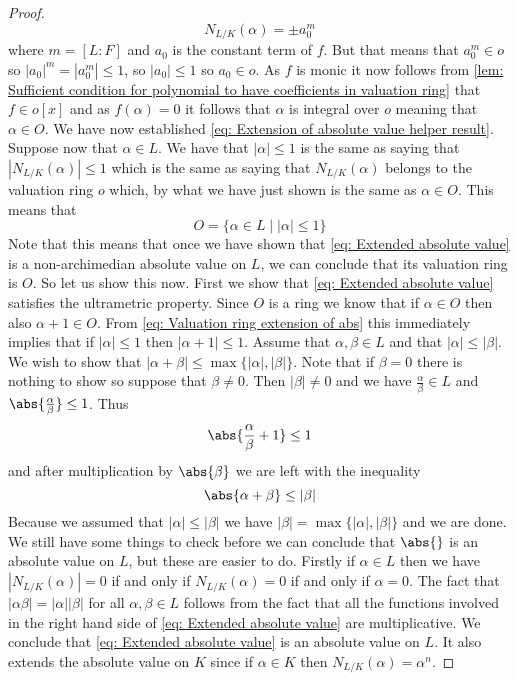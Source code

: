 \documentclass{article}
\numberwithin{equation}{section}
\begin{document}
\begin{proof}
    $$N_{L / K}(\alpha) =  \pm a_0^m$$
    where $m = [L : F]$ and $a_0$ is the constant term of $f$. But that means that $a_0^m \in o$ so $|a_0|^m = |a_0^m| \leq 1$, so $|a_0| \leq 1$ so $a_0 \in o$. As $f$ is monic it now follows from \cref{lem: Sufficient condition for polynomial to have coefficients in valuation ring}  that $f \in o[x]$ and as $f(\alpha) = 0$ it follows that $\alpha$ is integral over $o$ meaning that $\alpha \in O$. We have now established \cref{eq: Extension of absolute value helper result}. Suppose now that $\alpha \in L$. We have that $|\alpha| \leq 1$ is the same as saying that $|N_{L/K}(\alpha)| \leq 1$ which is the same as saying that $N_{L/K}(\alpha)$ belongs to the valuation ring $o$ which, by what we have just shown is the same as $\alpha \in O$. This means that
    \begin{equation}\label{eq: Valuation ring extension of abs}
        O = \{\alpha \in L \mid |\alpha| \leq 1  \}
    \end{equation}
    Note that this means that once we have shown that \cref{eq: Extended absolute value} is a non-archimedian absolute value on $L$, we can conclude that its valuation ring is $O$. So let us show this now. First we show that \cref{eq: Extended absolute value} satisfies the ultrametric property. Since $O$ is a ring we know that if $\alpha \in O$ then also $\alpha + 1 \in O$. From \cref{eq: Valuation ring extension of abs} this immediately implies that if $|\alpha|\leq 1$ then $|\alpha + 1| \leq 1$. Assume that $\alpha, \beta \in L$ and that $|\alpha| \leq |\beta|$. We wish to show that $|\alpha + \beta |\leq \max\{|\alpha|, |\beta| \}$. Note that if $\beta = 0$ there is nothing to show so suppose that $\beta \neq 0$. Then $|\beta| \neq 0$ and we have $\frac{\alpha}{\beta} \in L$ and $\abs{\frac{\alpha}{\beta}} \leq 1$. Thus
    $$\abs{\frac{\alpha}{\beta} + 1} \leq 1$$
    and after multiplication by $\abs {\beta}$ we are left with the inequality
    $$\abs{\alpha + \beta} \leq |\beta|$$
    Because we assumed that $|\alpha| \leq |\beta|$ we have $|\beta| = \max \{|\alpha|,|\beta| \}$ and we are done. We still have some things to check before we can conclude that $\abs{}$ is an absolute value on $L$, but these are easier to do. Firstly if $\alpha \in L$ then we have $|N_{L/K}(\alpha)| = 0$ if and only if $N_{L/K}(\alpha) = 0$ if and only if $\alpha = 0$. The fact that $|\alpha \beta| = |\alpha| |\beta|$ for all $\alpha,\beta \in L$ follows from the fact that all the functions involved in the right hand side of \cref{eq: Extended absolute value} are multiplicative. We conclude that \cref{eq: Extended absolute value} is an absolute value on $L$. It also extends the absolute value on $K$ since if $\alpha \in K$ then $N_{L/K}(\alpha)= \alpha^n$.


\end{proof}
\end{document}
